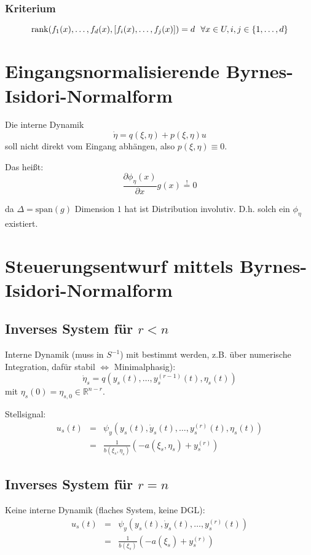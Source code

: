 \subsubsection{Kriterium}
\begin{equation}
    \operatorname*{rank}(f_1(x), \ldots, f_d(x), [f_i(x), \ldots, f_j(x)]) = d\ \ \forall x \in U, i, j \in \{1, \ldots, d\}
\end{equation}

\section{Eingangsnormalisierende Byrnes-Isidori-Normalform}
Die interne Dynamik
\begin{equation}
    \dot{\eta} = q(\xi, \eta) + p(\xi, \eta) u
\end{equation}
soll nicht direkt vom Eingang abhängen, also $p(\xi, \eta) \equiv 0$.

Das heißt:
\begin{equation}
    \frac{\partial \phi_\eta(x)}{\partial x}g(x) \stackrel{!}{=} 0
\end{equation}

da $\Delta = \text{span}(g)$ Dimension $1$ hat ist Distribution involutiv. D.h. solch
ein $\phi_\eta$ existiert.

\section{Steuerungsentwurf mittels Byrnes-Isidori-Normalform}
\subsection{Inverses System für $r<n$}
Interne Dynamik (muss in $S^{-1}$) mit bestimmt werden, z.B. über numerische Integration,
dafür stabil $\Leftrightarrow$ Minimalphasig):
\begin{equation}
    \dot{\eta}_s = q(y_s(t), \ldots, y_s^{(r-1)}(t), \eta_s(t))
\end{equation}
mit $\eta_s(0) = \eta_{s,0} \in \mathbb{R}^{n-r}$.

Stellsignal:
\begin{eqnarray}
    u_s(t) &=& \psi_y(y_s(t), \dot{y}_s(t), \ldots, y_s^{(r)}(t), \eta_s(t)) \\
        &=& \frac{1}{b(\xi_s, \eta_s)} (-a(\xi_s, \eta_s) + y_s^{(r)})
\end{eqnarray}

\subsection{Inverses System für $r=n$}
Keine interne Dynamik (flaches System, keine DGL):
\begin{eqnarray}
    u_s(t) &=& \psi_y(y_s(t), \dot{y}_s(t), \ldots, y_s^{(r)}(t)) \\
        &=& \frac{1}{b(\xi_s)} (-a(\xi_s) + y_s^{(r)})
\end{eqnarray}

